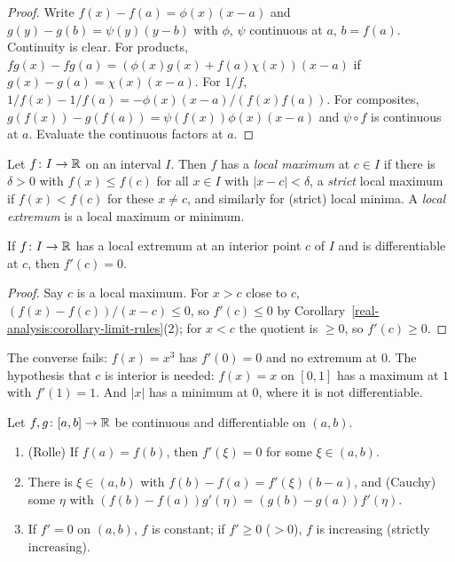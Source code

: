 \begin{proof}
Write $f(x) - f(a) = \phi(x)(x - a)$ and $g(y) - g(b) = \psi(y)(y - b)$ with $\phi$, $\psi$ continuous at $a$, $b = f(a)$. Continuity is clear. For products,
$fg(x) - fg(a) = (\phi(x)g(x) + f(a)\chi(x))(x - a)$ if $g(x) - g(a) = \chi(x)(x - a)$. For $1/f$, $1/f(x) - 1/f(a) = -\phi(x)(x - a)/(f(x)f(a))$. For composites,
$g(f(x)) - g(f(a)) = \psi(f(x))\phi(x)(x - a)$ and $\psi \circ f$ is continuous at $a$. Evaluate the continuous factors at $a$.
\end{proof}

\begin{definition}\label{real-analysis:definition-local-extremum}
Let $f \colon I \to \mathbb{R}$ on an interval $I$. Then $f$ has a \emph{local maximum} at $c \in I$ if there is $\delta > 0$ with $f(x) \leq f(c)$ for all $x \in I$ with $|x - c| < \delta$, a \emph{strict} local maximum if
$f(x) < f(c)$ for these $x \neq c$, and similarly for (strict) local minima. A \emph{local extremum} is a local maximum or minimum.
\end{definition}

\begin{lemma}[Fermat]\label{real-analysis:lemma-fermat}
If $f \colon I \to \mathbb{R}$ has a local extremum at an interior point $c$ of $I$ and is differentiable at $c$, then $f'(c) = 0$.
\end{lemma}

\begin{proof}
Say $c$ is a local maximum. For $x > c$ close to $c$, $(f(x) - f(c))/(x - c) \leq 0$, so $f'(c) \leq 0$ by Corollary~\ref{real-analysis:corollary-limit-rules}(2); for $x < c$ the quotient is $\geq 0$, so $f'(c) \geq 0$.
\end{proof}

\begin{counterexample}\label{real-analysis:counterexample-fermat}
The converse fails: $f(x) = x^3$ has $f'(0) = 0$ and no extremum at $0$. The hypothesis that $c$ is interior is needed: $f(x) = x$ on $[0, 1]$ has a maximum at $1$ with $f'(1) = 1$. And $|x|$ has a minimum at $0$,
where it is not differentiable.
\end{counterexample}

\begin{theorem}\label{real-analysis:theorem-mean-value}
Let $f, g \colon [a, b] \to \mathbb{R}$ be continuous and differentiable on $(a, b)$.
\begin{enumerate}
\item (Rolle) If $f(a) = f(b)$, then $f'(\xi) = 0$ for some $\xi \in (a, b)$.
\item There is $\xi \in (a, b)$ with $f(b) - f(a) = f'(\xi)(b - a)$, and (Cauchy) some $\eta$ with $(f(b) - f(a))g'(\eta) = (g(b) - g(a))f'(\eta)$.
\item If $f' = 0$ on $(a, b)$, $f$ is constant; if $f' \geq 0$ ($> 0$), $f$ is increasing (strictly increasing).
\end{enumerate}
\end{theorem}

